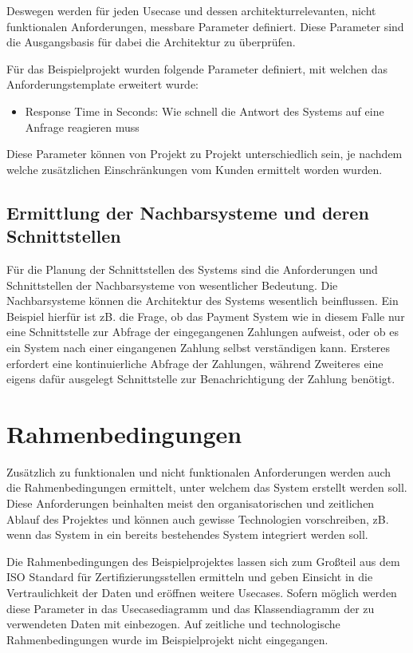 Deswegen werden für jeden Usecase und dessen architekturrelevanten, nicht funktionalen Anforderungen, messbare Parameter definiert. Diese Parameter sind die Ausgangsbasis für dabei die Architektur zu überprüfen.

Für das Beispielprojekt wurden folgende Parameter definiert, mit welchen das Anforderungstemplate erweitert wurde:

\begin{itemize}
  \item Response Time in Seconds: Wie schnell die Antwort des Systems auf eine Anfrage reagieren muss
\end{itemize}

Diese Parameter können von Projekt zu Projekt unterschiedlich sein, je nachdem welche zusätzlichen Einschränkungen vom Kunden ermittelt worden wurden.

\subsection{Ermittlung der Nachbarsysteme und deren Schnittstellen}
Für die Planung der Schnittstellen des Systems sind die Anforderungen und Schnittstellen der Nachbarsysteme von wesentlicher Bedeutung. Die Nachbarsysteme können die Architektur des Systems wesentlich beinflussen. Ein Beispiel hierfür ist zB. die Frage, ob das Payment System wie in diesem Falle nur eine Schnittstelle zur Abfrage der eingegangenen Zahlungen aufweist, oder ob es ein System nach einer eingangenen Zahlung selbst verständigen kann. Ersteres erfordert eine kontinuierliche Abfrage der Zahlungen, während Zweiteres eine eigens dafür ausgelegt Schnittstelle zur Benachrichtigung der Zahlung benötigt.

\section{Rahmenbedingungen}
Zusätzlich zu funktionalen und nicht funktionalen Anforderungen werden auch die Rahmenbedingungen ermittelt, unter welchem das System erstellt werden soll. Diese Anforderungen beinhalten meist den organisatorischen und zeitlichen Ablauf des Projektes und können auch gewisse Technologien vorschreiben, zB. wenn das System in ein bereits bestehendes System integriert werden soll. \cite[S. 9]{review}\cite[S. 110]{softarch}

Die Rahmenbedingungen des Beispielprojektes lassen sich zum Großteil aus dem ISO Standard für Zertifizierungsstellen ermitteln \cite{ISO_CERT} und geben Einsicht in die Vertraulichkeit der Daten und eröffnen weitere Usecases. Sofern möglich werden diese Parameter in das Usecasediagramm und das Klassendiagramm der zu verwendeten Daten mit einbezogen. Auf zeitliche und technologische Rahmenbedingungen wurde im Beispielprojekt nicht eingegangen.

